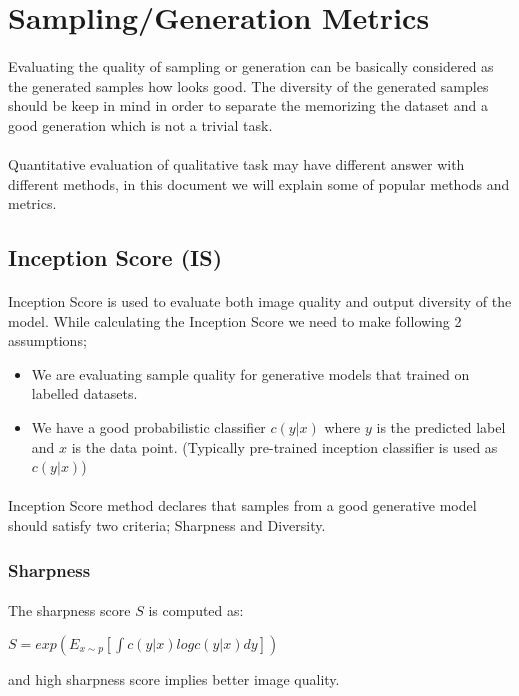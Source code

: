 \documentclass{article}
\begin{document}
\section{Sampling/Generation Metrics}
\paragraph{}
Evaluating the quality of sampling or generation can be basically considered as the generated samples how looks good. The diversity of the generated samples should be keep in mind in order to separate the memorizing the dataset and a good generation which is not a trivial task.
\paragraph{}
Quantitative evaluation of qualitative task may have different answer with different methods, in this document we will explain some of popular methods and metrics.
    \subsection{Inception Score (IS)}
    \paragraph{}
    Inception Score is used to evaluate both image quality and output diversity of the model. While calculating the Inception Score we need to make following 2 assumptions;
    \begin{itemize}
        \item We are evaluating sample quality for generative models that trained on labelled datasets.
        \item We have a good probabilistic classifier $c(y|x)$ where $y$ is the predicted label and $x$ is the data point. (Typically pre-trained inception classifier is used as $c(y|x)$)
    \end{itemize}
    \paragraph{}
    Inception Score method declares that samples from a good generative model should satisfy two criteria; Sharpness and Diversity.
        \subsubsection{Sharpness}
        \paragraph{}
        The sharpness score $S$ is computed as:
        \begin{center}
            $S = exp(E_{x\sim p}[\int c(y|x)logc(y|x)dy])$
        \end{center}
        and high sharpness score implies better image quality.
        
\end{document}
